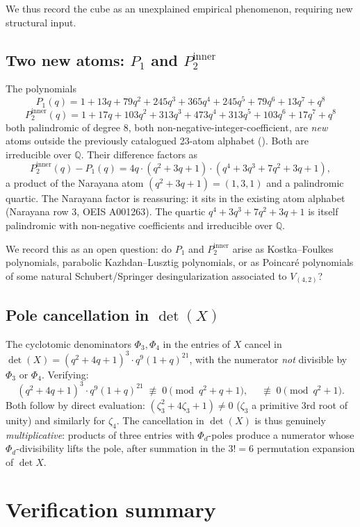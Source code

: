 \documentclass[11pt]{article}
\theoremstyle{plain}
\theoremstyle{definition}
\theoremstyle{remark}
\newcommand{\Q}{\mathbb{Q}}
\begin{document}
We thus record the cube as an unexplained empirical phenomenon, requiring
new structural input.

\subsection{Two new atoms: $P_1$ and $P_2^{\mathrm{inner}}$}

The polynomials
\[
P_1(q) = 1 + 13q + 79q^2 + 245q^3 + 365q^4 + 245q^5 + 79q^6 + 13q^7 + q^8
\]
\[
P_2^{\mathrm{inner}}(q) = 1 + 17q + 103q^2 + 313q^3 + 473q^4 + 313q^5 + 103q^6 + 17q^7 + q^8
\]
both palindromic of degree 8, both non-negative-integer-coefficient, are
\emph{new} atoms outside the previously catalogued 23-atom alphabet
(\cite{atom-alphabet, project-pieri-atom-rule}). Both are irreducible
over $\Q$. Their difference factors as
\[
P_2^{\mathrm{inner}}(q) - P_1(q) = 4q \cdot (q^2 + 3q + 1) \cdot (q^4 + 3q^3 + 7q^2 + 3q + 1),
\]
a product of the Narayana atom $(q^2 + 3q + 1) = (1,3,1)$ and a palindromic
quartic. The Narayana factor is reassuring: it sits in the existing atom
alphabet (Narayana row 3, OEIS A001263). The quartic
$q^4 + 3q^3 + 7q^2 + 3q + 1$ is itself palindromic with non-negative
coefficients and irreducible over $\Q$.

We record this as an open question: do $P_1$ and $P_2^{\mathrm{inner}}$
arise as Kostka--Foulkes polynomials, parabolic Kazhdan--Lusztig polynomials,
or as Poincar\'e polynomials of some natural Schubert/Springer
desingularization associated to $V_{(4,2)}$?

\subsection{Pole cancellation in $\det(X)$}

The cyclotomic denominators $\Phi_3, \Phi_4$ in the entries of $X$ cancel
in $\det(X) = (q^2+4q+1)^3 \cdot q^9 (1+q)^{21}$, with the numerator
\emph{not} divisible by $\Phi_3$ or $\Phi_4$. Verifying:
\[
(q^2 + 4q + 1)^3 \cdot q^9 (1+q)^{21} \;\not\equiv\; 0 \pmod{q^2 + q + 1}, \quad
\;\not\equiv\; 0 \pmod{q^2 + 1}.
\]
Both follow by direct evaluation: $(\zeta_3^2 + 4\zeta_3 + 1) \neq 0$
($\zeta_3$ a primitive 3rd root of unity) and similarly for $\zeta_4$.
The cancellation in $\det(X)$ is thus genuinely \emph{multiplicative}:
products of three entries with $\Phi_d$-poles produce a numerator whose
$\Phi_d$-divisibility lifts the pole, after summation in the
$3! = 6$ permutation expansion of $\det X$.

\section{Verification summary}
\end{document}
